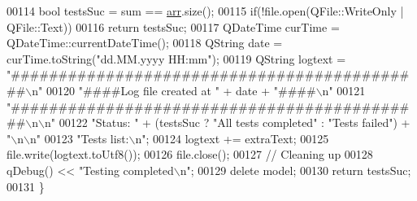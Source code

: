 \begin{DoxyCode}
00114     \textcolor{keywordtype}{bool} testsSuc = sum == \mbox{\hyperlink{namespacetests-setup_a274aaa7c0d5733ef5f48372d9481f34a}{arr}}.size();
00115     \textcolor{keywordflow}{if}(!file.open(QFile::WriteOnly | QFile::Text))
00116         \textcolor{keywordflow}{return} testsSuc;
00117     QDateTime curTime = QDateTime::currentDateTime();
00118     QString date = curTime.toString(\textcolor{stringliteral}{"dd.MM.yyyy HH:mm"});
00119     QString logtext = \textcolor{stringliteral}{"############################################\(\backslash\)n"}
00120                       \textcolor{stringliteral}{"####Log file created at "} + date + \textcolor{stringliteral}{"####\(\backslash\)n"}
00121                       \textcolor{stringliteral}{"############################################\(\backslash\)n\(\backslash\)n"}
00122                       \textcolor{stringliteral}{"Status: "} + (testsSuc ? \textcolor{stringliteral}{"All tests completed"} : \textcolor{stringliteral}{"Tests failed"}) + \textcolor{stringliteral}{"\(\backslash\)n\(\backslash\)n"}
00123                       \textcolor{stringliteral}{"Tests list:\(\backslash\)n"};
00124     logtext += extraText;
00125     file.write(logtext.toUtf8());
00126     file.close();
00127     \textcolor{comment}{// Cleaning up}
00128     qDebug() << \textcolor{stringliteral}{"Testing completed\(\backslash\)n"};
00129     \textcolor{keyword}{delete} model;
00130     \textcolor{keywordflow}{return} testsSuc;
00131 \}
\end{DoxyCode}
